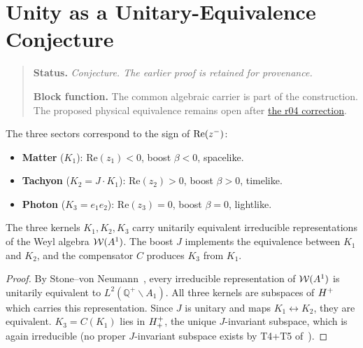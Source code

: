 
\section{Unity as a Unitary-Equivalence Conjecture}
\begin{quote}\small
\noindent\textbf{Status.} \emph{Conjecture. The earlier proof is retained for provenance.}\par
\noindent\textbf{Block function.} The common algebraic carrier is part of the construction. The proposed physical equivalence remains open after \hyperref[sec:v480-r04-riemann-decoupling]{the r04 correction}.
\end{quote}
\label{sec:unitary}

\begin{definition}
The three sectors correspond to the sign of $\mathrm{Re}(z^-)$:
\begin{itemize}
 \item \textbf{Matter} ($K_1$): $\mathrm{Re}(z_1)<0$, boost $\beta<0$, spacelike.
 \item \textbf{Tachyon} ($K_2=J\cdot K_1$): $\mathrm{Re}(z_2)>0$, boost $\beta>0$, timelike.
 \item \textbf{Photon} ($K_3=e_1 e_2$): $\mathrm{Re}(z_3)=0$, boost $\beta=0$, lightlike.
\end{itemize}
\end{definition}


\begin{theorem}\label{thm:unitary-equiv}
The three kernels $K_1,K_2,K_3$ carry unitarily equivalent
irreducible representations of the Weyl algebra $\mathcal{W}(A^1)$.
The boost $J$ implements the equivalence between $K_1$ and $K_2$,
and the compensator $C$ produces $K_3$ from $K_1$.
\end{theorem}

\begin{proof}
By Stone--von Neumann~\cite{brendecke2026rh}, every irreducible
representation of $\mathcal{W}(A^1)$ is unitarily equivalent to $L^2(\mathbb{Q}^+\backslash A_1)$.
All three kernels are subspaces of $H^+$ which carries this
representation.
Since $J$ is unitary and maps $K_1\leftrightarrow K_2$, they are
equivalent.
$K_3=C(K_1)$ lies in $H^+_+$, the unique $J$-invariant subspace,
which is again irreducible (no proper $J$-invariant subspace exists by
T4+T5 of~\cite{brendecke2026rh}).
\end{proof}


